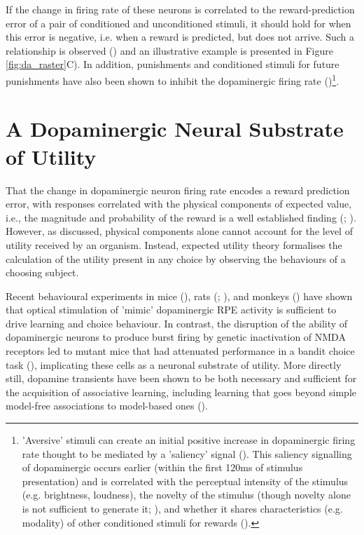 If the change in firing rate of these neurons is correlated to the reward-prediction error of a pair of conditioned and unconditioned stimuli, it should hold for when this error is negative, i.e. when a reward is predicted, but does not arrive. Such a relationship is observed (\cite{schultzNeuralSubstratePrediction1997}) and an illustrative example is presented in Figure \ref{fig:da_raster}C). In addition, punishments and conditioned stimuli for future punishments have also been shown to inhibit the dopaminergic firing rate (\cite{mirenowiczImportanceUnpredictabilityReward1994})\footnote{'Aversive' stimuli can create an initial positive increase in dopaminergic firing rate thought to be mediated by a 'saliency' signal (\cite{schultzDopamineRewardPredictionerror2016}). This saliency signalling of dopaminergic occurs earlier (within the first 120ms of stimulus presentation) and is correlated with the perceptual intensity of the stimulus (e.g. brightness, loudness), the novelty of the stimulus (though novelty alone is not sufficient to generate it; \cite{toblerAdaptiveCodingReward2005}), and whether it shares characteristics (e.g. modality) of other conditioned stimuli for rewards (\cite{dayAssociativeLearningMediates2007}).}.

\clearpage
\section{A Dopaminergic Neural Substrate of Utility}

That the change in dopaminergic neuron firing rate encodes a reward prediction error, with responses correlated with the physical components of expected value, i.e., the magnitude and probability of the reward is a well established finding (\cite{fiorilloDiscreteCodingReward2003}; \cite{toblerAdaptiveCodingReward2005}). However, as discussed, physical components alone cannot account for the level of utility received by an organism. Instead, expected utility theory formalises the calculation of the utility present in any choice by observing the behaviours of a choosing subject.

Recent behavioural experiments in mice (\cite{kimOptogeneticMimicryTransient2012}), rats (\cite{changBriefOptogeneticInhibition2016}; \cite{steinbergCausalLinkPrediction2013}), and monkeys (\cite{staufferDopamineNeuronSpecificOptogenetic2016a}) have shown that optical stimulation of 'mimic' dopaminergic RPE activity is sufficient to drive learning and choice behaviour. In contrast, the disruption of the ability of dopaminergic neurons to produce burst firing by genetic inactivation of NMDA receptors led to mutant mice that had attenuated performance in a bandit choice task (\cite{zweifelDisruptionNMDARdependentBurst2009}), implicating these cells as a neuronal substrate of utility. More directly still, dopamine transients have been shown to be both necessary and sufficient for the acquisition of associative learning, including learning that goes beyond simple model-free associations to model-based ones (\cite{sharpeDopamineTransientsAre2017}).

